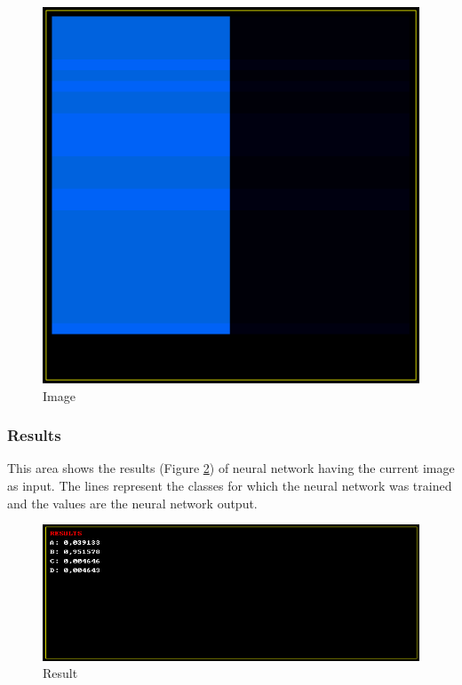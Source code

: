 \documentclass[12pt]{article}
\begin{document}
\begin{figure}[H]
    \centering
    \includegraphics[scale=0.60]{images/image.png}
    \caption{Image}
    \label{image}
\end{figure}

\subsubsection*{Results}
This area shows the results (Figure \ref{results}) of neural network having
the current image as input. The lines represent the classes for which the
neural network was trained and the values are the neural network output.

\begin{figure}[H]
    \centering
    \includegraphics[width=\textwidth]{images/results.png}
    \caption{Result}
    \label{results}
\end{figure}
\end{document}
